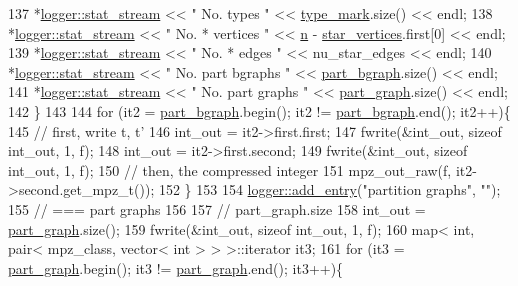 \begin{DoxyCode}
137     *\hyperlink{classlogger_a7db37821f875f2ba3540980b355779f5}{logger::stat\_stream} << \textcolor{stringliteral}{" No. types         "} << 
      \hyperlink{classmarked__graph__compressed_a86b00223525703e973415cbc9c94da68}{type\_mark}.size() << endl;
138     *\hyperlink{classlogger_a7db37821f875f2ba3540980b355779f5}{logger::stat\_stream} << \textcolor{stringliteral}{" No. * vertices    "} << \hyperlink{classmarked__graph__compressed_a8d841016ddb11cfd33748c8deb6277ba}{n} - 
      \hyperlink{classmarked__graph__compressed_a7a4ced4586e2e353f9076bd447df5208}{star\_vertices}.first[0] << endl;
139     *\hyperlink{classlogger_a7db37821f875f2ba3540980b355779f5}{logger::stat\_stream} << \textcolor{stringliteral}{" No. * edges       "} << nu\_star\_edges << endl;
140     *\hyperlink{classlogger_a7db37821f875f2ba3540980b355779f5}{logger::stat\_stream} << \textcolor{stringliteral}{" No. part bgraphs  "} << 
      \hyperlink{classmarked__graph__compressed_a7b3267063fba30b45eb21b3ba4e07536}{part\_bgraph}.size() << endl;
141     *\hyperlink{classlogger_a7db37821f875f2ba3540980b355779f5}{logger::stat\_stream} << \textcolor{stringliteral}{" No. part graphs   "} << 
      \hyperlink{classmarked__graph__compressed_ae179a4737e6eab905c18a94d44ef64b7}{part\_graph}.size() << endl;
142   \}
143 
144   \textcolor{keywordflow}{for} (it2 = \hyperlink{classmarked__graph__compressed_a7b3267063fba30b45eb21b3ba4e07536}{part\_bgraph}.begin(); it2 != \hyperlink{classmarked__graph__compressed_a7b3267063fba30b45eb21b3ba4e07536}{part\_bgraph}.end(); it2++)\{
145     \textcolor{comment}{// first, write t, t'}
146     int\_out = it2->first.first;
147     fwrite(&int\_out, \textcolor{keyword}{sizeof} int\_out, 1, f);
148     int\_out = it2->first.second;
149     fwrite(&int\_out, \textcolor{keyword}{sizeof} int\_out, 1, f);
150     \textcolor{comment}{// then, the compressed integer}
151     mpz\_out\_raw(f, it2->second.get\_mpz\_t());
152   \}
153 
154   \hyperlink{classlogger_a710163deb17bc81f70d53d285b8ac9ac}{logger::add\_entry}(\textcolor{stringliteral}{"partition graphs"}, \textcolor{stringliteral}{""});
155   \textcolor{comment}{// === part graphs}
156 
157   \textcolor{comment}{// part\_graph.size}
158   int\_out = \hyperlink{classmarked__graph__compressed_ae179a4737e6eab905c18a94d44ef64b7}{part\_graph}.size();
159   fwrite(&int\_out, \textcolor{keyword}{sizeof} int\_out, 1, f);
160   map< int, pair< mpz\_class, vector< int > > >::iterator it3;
161   \textcolor{keywordflow}{for} (it3 = \hyperlink{classmarked__graph__compressed_ae179a4737e6eab905c18a94d44ef64b7}{part\_graph}.begin(); it3 != \hyperlink{classmarked__graph__compressed_ae179a4737e6eab905c18a94d44ef64b7}{part\_graph}.end(); it3++)\{

\end{DoxyCode}

